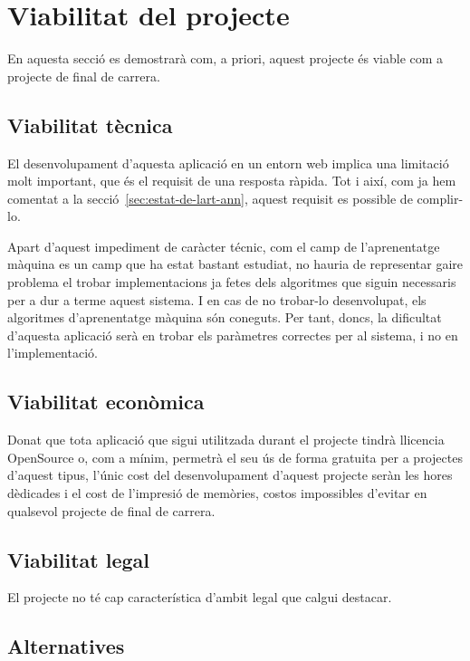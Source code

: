 \chapter{Viabilitat del projecte}

En aquesta secció es demostrarà com, a priori, aquest projecte és viable com a projecte de final de carrera.

\section{Viabilitat tècnica}

El desenvolupament d'aquesta aplicació en un entorn web implica una limitació molt important, que és el requisit de una resposta ràpida. Tot i així, com ja hem comentat a la secció~\ref{sec:estat-de-lart-ann}, aquest requisit es possible de complir-lo.

Apart d'aquest impediment de caràcter técnic, com el camp de l'aprenentatge màquina es un camp que ha estat bastant estudiat, no hauria de representar gaire problema el trobar implementacions ja fetes dels algoritmes que siguin necessaris per a dur a terme aquest sistema. I en cas de no trobar-lo desenvolupat, els algoritmes d'aprenentatge màquina són coneguts. Per tant, doncs, la dificultat d'aquesta aplicació serà en trobar els paràmetres correctes per al sistema, i no en l'implementació.

\section{Viabilitat econòmica}

Donat que tota aplicació que sigui utilitzada durant el projecte tindrà llicencia OpenSource o, com a mínim, permetrà el seu ús de forma gratuita per a projectes d'aquest tipus, l'únic cost del desenvolupament d'aquest projecte seràn les hores dèdicades i el cost de l'impresió de memòries, costos impossibles d'evitar en qualsevol projecte de final de carrera.

\section{Viabilitat legal}

El projecte no té cap característica d'ambit legal que calgui destacar.

\section{Alternatives}

